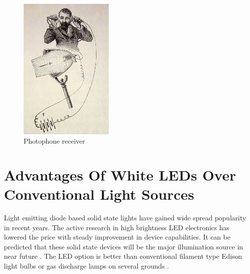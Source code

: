 \begin{figure}[!hbtp]
\centering
\includegraphics[angle=0,height=7cm]{./Figures/Photophone_receiver.jpg}
\caption[Photophone receiver]{Photophone receiver\cite{photoRx}}
 \label{fig:photophone_receiver}
\end{figure}

 

%


\section{Advantages Of White LEDs Over Conventional Light Sources}



Light emitting diode based solid state lights have gained wide spread popularity in recent years. The active research in high brightness LED electronics has lowered the price with steady improvement in device capabilities. It can be predicted that these solid state devices will be the major illumination source in near future \cite{schubert2005solid}. The LED option is better than conventional filament type Edison light bulbs or gas discharge lamps on several grounds \cite{4781063}. 

